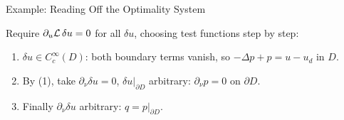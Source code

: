 \documentclass[main.tex]{subfiles}
\begin{document}
\begin{frame}{Example: Reading Off the Optimality System}
  \begin{hlbox}
    Require $\partial_u \mathcal{L}\,\delta u = 0$ for all $\delta u$, choosing test functions step by step:
    \begin{enumerate}
      \item<2-> $\delta u \in C_c^\infty(D)$: both boundary terms vanish, so \hfill $-\Delta p + p = u - u_d$ in $D$.
      \item<3-> By (1), take $\partial_\nu\delta u = 0$, $\delta u|_{\partial D}$ arbitrary: \hfill $\partial_\nu p = 0$ on $\partial D$.
      \item<4-> Finally $\partial_\nu\delta u$ arbitrary: \hfill $q = p|_{\partial D}$.
    \end{enumerate}
  \end{hlbox}


  \vfill\hfill\hyperlink{kkt<3>}{}
\end{frame}
\end{document}
